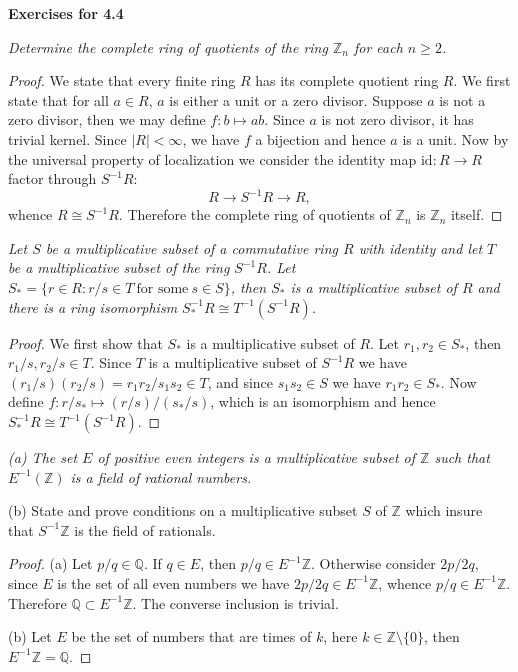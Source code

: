\begin{center}
\begin{large}
    \textbf{Exercises for 4.4}
\end{large}
\end{center}
\begin{problem}\em
Determine the complete ring of quotients of the ring $\mathbb{Z}_n$ for each $n\ge 2$.
\end{problem}
\begin{proof}
We state that every finite ring $R$ has its complete quotient ring $R$. We first state that for all $a\in R$, $a$ is either a unit or a zero divisor. Suppose $a$ is not a zero divisor, then we may define $f:b\mapsto ab$. Since $a$ is not zero divisor, it has trivial kernel. Since $|R|<\infty$, we have $f$ a bijection and hence $a$ is a unit. Now by the universal property of localization we consider the identity map $\mathrm{id}:R\to R$ factor through $S^{-1}R$:
$$
R\longrightarrow S^{-1}R\longrightarrow R,
$$
whence $R\cong S^{-1}R$. Therefore the complete ring of quotients of $\mathbb{Z}_n$ is $\mathbb{Z}_n$ itself.
\end{proof}
\begin{problem}\em
Let $S$ be a multiplicative subset of a commutative ring $R$ with identity and let $T$ be a multiplicative subset of the ring $S^{-1}R$. Let $S_*=\{r\in R:r/s\in T\ \text{for some}\ s\in S\}$, then $S_*$ is a multiplicative subset of $R$ and there is a ring isomorphism $S_*^{-1}R\cong T^{-1}(S^{-1}R)$.
\end{problem}
\begin{proof}
We first show that $S_*$ is a multiplicative subset of $R$. Let $r_1,r_2\in S_*$, then $r_1/s,r_2/s\in T$. Since $T$ is a multiplicative subset of $S^{-1}R$ we have $(r_1/s)(r_2/s)=r_1r_2/s_1s_2\in T$, and since $s_1s_2\in S$ we have $r_1r_2\in S_*$. Now define $f:r/s_*\mapsto(r/s)/(s_*/s)$, which is an isomorphism and hence $S_*^{-1}R\cong T^{-1}(S^{-1}R)$.
\end{proof}
\begin{problem}\em
(a) The set $E$ of positive even integers is a multiplicative subset of $\mathbb{Z}$ such that $E^{-1}(\mathbb{Z})$ is a field of rational numbers.\par
(b) State and prove conditions on a multiplicative subset $S$ of $\mathbb{Z}$ which insure that $S^{-1}\mathbb{Z}$ is the field of rationals.
\end{problem}
\begin{proof}
(a) Let $p/q\in\mathbb{Q}$. If $q\in E$, then $p/q\in E^{-1}\mathbb{Z}$. Otherwise consider $2p/2q$, since $E$ is the set of all even numbers we have $2p/2q\in E^{-1}\mathbb{Z}$, whence $p/q\in E^{-1}\mathbb{Z}$. Therefore $\mathbb{Q}\subset E^{-1}\mathbb{Z}$. The converse inclusion is trivial.\par
(b) Let $E$ be the set of numbers that are times of $k$, here $k\in\mathbb{Z}\setminus\{0\}$, then $E^{-1}\mathbb{Z}=\mathbb{Q}$.
\end{proof}

